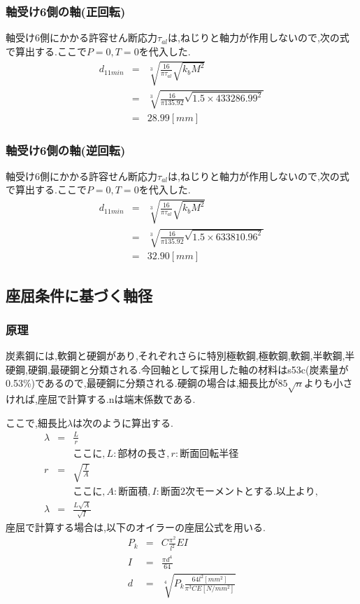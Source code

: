 \subsubsection{軸受け6側の軸(正回転)}
軸受け6側にかかる許容せん断応力$\tau_{al}$は,ねじりと軸力が作用しないので,次の式で算出する.ここで$P=0,T=0$を代入した.
\begin{eqnarray}
d_{11min} &=& \sqrt [3]{ \frac{16}{\pi \tau_{al}}\sqrt{k_bM^2} }\\
       &=& \sqrt [3]{ \frac{16}{\pi 135.92}\sqrt{1.5 \times 433286.99^2} }\\
       &=& 28.99[mm]
\end{eqnarray}
\subsubsection{軸受け6側の軸(逆回転)}
軸受け6側にかかる許容せん断応力$\tau_{al}$は,ねじりと軸力が作用しないので,次の式で算出する.ここで$P=0,T=0$を代入した.
\begin{eqnarray}
d_{11min} &=& \sqrt [3]{ \frac{16}{\pi \tau_{al}}\sqrt{k_bM^2} }\\
       &=& \sqrt [3]{ \frac{16}{\pi 135.92}\sqrt{1.5 \times 633810.96^2} }\\
       &=& 32.90[mm]
\end{eqnarray}

\subsection{座屈条件に基づく軸径}
\subsubsection{原理}
炭素鋼には,軟鋼と硬鋼があり,それぞれさらに特別極軟鋼,極軟鋼,軟鋼,半軟鋼,半硬鋼,硬鋼,最硬鋼と分類される.今回軸として採用した軸の材料はs53c(炭素量が0.53\%)であるので,最硬鋼に分類される.硬鋼の場合は,細長比が$85 \sqrt n$よりも小さければ,座屈で計算する.nは端末係数である.\\
\par
ここで,細長比$\lambda$は次のように算出する.
\begin{eqnarray}
\lambda &=& \frac{L}{r}\\
&&ここに,L:部材の長さ,r:断面回転半径\\
r&=&\sqrt{\frac{I}{A}}\\
&&ここに,A:断面積,I:断面2次モーメントとする.以上より,\\
\lambda &=& \frac{L\sqrt{A}}{\sqrt{I}}
\end{eqnarray}
座屈で計算する場合は,以下のオイラーの座屈公式を用いる.
\begin{eqnarray}
P_k &=& C\frac{\pi^2}{l^2}EI\\
I&=&\frac{\pi d^4}{64}\\
d&=&\sqrt[4]{P_k\frac{64l^2[mm^2]}{\pi^3CE[N/mm^2]}}
\end{eqnarray}
